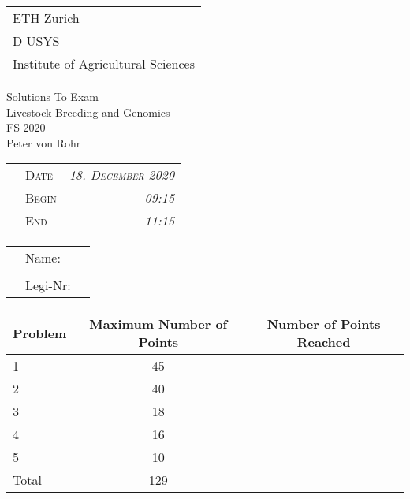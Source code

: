 \documentclass[
]{article}
\author{}
\date{\vspace{-2.5em}}
\begin{document}
\thispagestyle{empty}

\begin{tabular}{l}
ETH Zurich \\
D-USYS\\
Institute of Agricultural Sciences\\
\end{tabular}

\vspace{15ex}
\begin{center}
\huge
Solutions To Exam\\ \vspace{1ex}
Livestock Breeding and Genomics \\  \vspace{1ex}
FS 2020 \\

\normalsize
\vspace{7ex}
Peter von Rohr 
\end{center}

\vspace{7ex}
\begin{tabular}{p{5cm}lr}
  & \textsc{Date}  & \textsc{\emph{18. December 2020}} \\
  & \textsc{Begin} & \textsc{\emph{09:15 }}\\
  & \textsc{End}   & \textsc{\emph{11:15 }}\\ 
\end{tabular}

\vspace{5ex}

\large
\begin{tabular}{p{2.5cm}p{3cm}p{6cm}}
  &  Name:     &  \\
  &            &  \\
  &  Legi-Nr:  & \\
\end{tabular}
\normalsize

\vspace{9ex}
\begin{center}
\begin{tabular}{|p{3cm}|c|c|}
\hline
Problem  &  Maximum Number of Points  &  Number of Points Reached \\
\hline
1        &  45         & \\
\hline
2        &  40         & \\
\hline
3        &  18         & \\
\hline
4        &  16          & \\
\hline
5        &  10          & \\
\hline
Total    &  129    & \\
\hline
\end{tabular}
\end{center}
\end{document}
